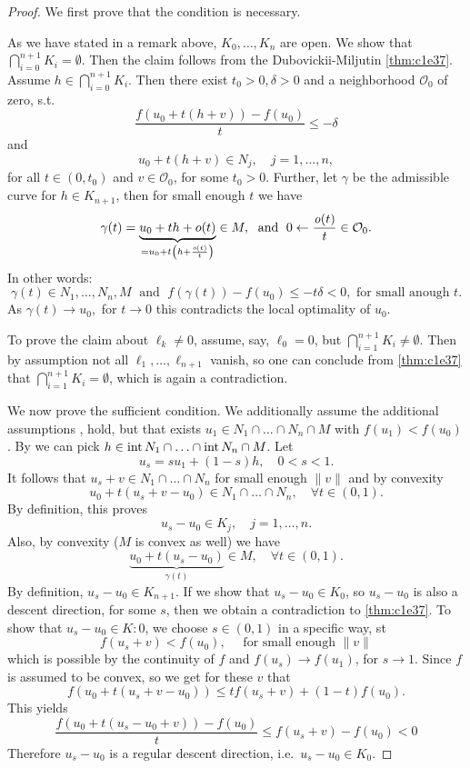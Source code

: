 \documentclass[../skript.tex]{subfiles}
\begin{document}
\begin{proof}
	We first prove that the condition is necessary.\par
	As we have stated in a remark above, $K_0,\ldots,K_n$ are open. We show that $\bigcap_{i=0}^{n+1}K_i=\emptyset$. Then the claim follows from the Dubovickii-Miljutin \cref{thm:c1e37}. Assume $h\in\bigcap_{i=0}^{n+1}K_i$. Then there exist $t_0>0,\delta>0$ and a neighborhood $\mathcal{O}_0$ of zero, s.t.
	\[
		\frac{f(u_0+  t(h+v)) - f(u_0)}{t}\leq -\delta 
	\]
	and
	\[
		u_0 + t(h+v)\in N_j,\quad j=1,\ldots,n,
	\]
	for all $t\in(0,t_0)$ and $v\in\mathcal{O}_0$, for some $t_0 > 0$. Further, let $\gamma$ be the admissible curve for $h\in K_{n+1}$, then for small enough $t$ we have
	\[
		\gamma(t) = \underbrace{u_0 + th + o(t)}_{=u_0 + t\left(h+\frac{\mathit{o}(t)}{t}\right)}\in M, \; \text{ and } \; 0\leftarrow\frac{\mathit{o}(t)}{t}\in\mathcal{O}_0.
	\]
	In other words:
	\[
		\gamma(t)\in N_1,\ldots,N_n,M\;\text{ and }\;f(\gamma(t)) - f(u_0) \leq -t\delta < 0,\text{ for small anough }t.
	\]
	As $\gamma(t)\to u_0,$ for $t\to 0$ this contradicts the local optimality of $u_0$.\par
	To prove the claim about $\ell_k\not=0$, assume, say, $\ell_0 = 0$, but $\bigcap_{i=1}^{n+1}K_i\not=\emptyset$. Then by assumption not all $\ell_1,\ldots,\ell_{n+1}$ vanish, so one can conclude from \cref{thm:c1e37} that $\bigcap_{i=1}^{n+1}K_i = \emptyset$, which is again a contradiction.\par
	We now prove the sufficient condition. We additionally assume the additional assumptions ,  hold, but that exists $u_1\in N_1\cap\ldots\cap N_n\cap M$ with $f(u_1)<f(u_0)$. By  we can pick $h\in \operatorname{int} N_1 \cap\ldots\cap \operatorname{int} N_n\cap M$. Let
	\[
		u_s = su_1 + (1-s)h,\quad 0<s<1.
	\]
	It follows that $u_s+v\in N_1\cap\ldots\cap N_n$ for small enough $\|v\|$ and by convexity
	\[
		u_0 + t(u_s+v-u_0)\in N_1\cap\ldots\cap N_n,\quad\forall t\in (0,1).
	\]
	By definition, this proves
	\[
		u_s-u_0\in K_j,\quad j=1,\ldots,n.
	\]
	Also, by convexity ($M$ is convex as well) we have 
	\[
		\underbrace{u_0 + t(u_s-u_0)}_{\gamma(t)}\in M,\quad\forall t\in(0,1).
	\]
	By definition, $u_s-u_0 \in K_{n+1}$. If we show that $u_s-u_0\in K_0$, so $u_s-u_0$ is also a descent direction, for some $s$, then we obtain a contradiction to \cref{thm:c1e37}. To show that $u_s-u_0\in K:0$, we choose $s\in(0,1)$ in a specific way, \ac{st}
	\[
		f(u_s+v) < f(u_0),\quad\text{ for small enough }\|v\|
	\]
	which is possible by the continuity of $f$ and $f(u_s)\to f(u_1)$, for $s\to 1$. Since $f$ is assumed to be convex, so we get for these $v$ that
	\[
		f(u_0+t(u_s+v-u_0)) \leq t f(u_s+v) + (1-t) f(u_0).
	\]
	This yields
	\[
		\frac{f(u_0+t(u_s-u_0+v))-f(u_0)}{t}\leq f(u_s+v)-f(u_0) < 0
	\]
	Therefore $u_s-u_0$ is a regular descent direction, i.e.~$u_s-u_0\in K_0$.
\end{proof}
\end{document}
